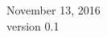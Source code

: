 \begin{titlepage}


{\large November 13, 2016}\\[0.5cm] %
{\large version 0.1}\\[2cm]
 

\vfill %
\clearpage
\end{titlepage}
